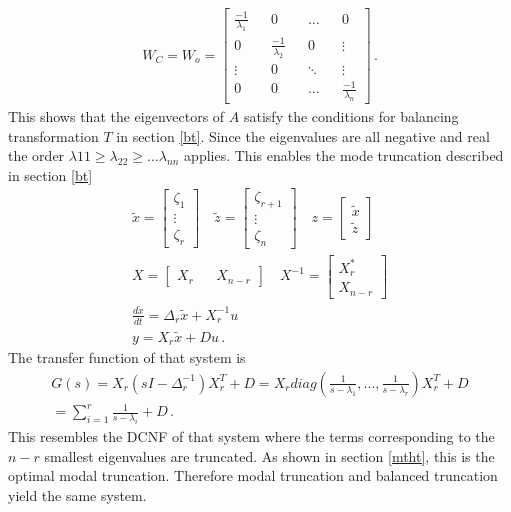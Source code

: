 \begin{gather}
W_C = W_o = \begin{bmatrix}
\frac{-1}{\lambda_1} && 0 && \hdots && 0 \\
0 && \frac{-1}{\lambda_2}&& 0 && \vdots \\
\vdots && 0 && \ddots && \vdots \\
0 && 0 && \hdots && \frac{-1}{\lambda_n}
\end{bmatrix} \,.
\end{gather}
This shows that the eigenvectors of \(A\) satisfy the conditions for balancing transformation \(T\) in section \ref{bt}.
Since the eigenvalues are all negative and real the order \(\lambda{11} \geq \lambda_{22} \geq ...  \lambda_{nn}\) applies.
This enables the mode truncation described in section \ref{bt}
\begin{gather}
\tilde{x} = \begin{bmatrix}
\zeta_1 \\
\vdots \\
\zeta_r
\end{bmatrix} \quad 
\tilde{z} = \begin{bmatrix}
\zeta_{r+1} \\
\vdots \\
\zeta_n
\end{bmatrix} \quad
z = \begin{bmatrix}
\tilde{x} \\
\tilde{z}
\end{bmatrix}\\
X= \begin{bmatrix}
X_r && X_{n-r}
\end{bmatrix} \quad
X^{-1} = \begin{bmatrix}
X_r^{*} \\
X_{n-r}
\end{bmatrix} \\
\frac{d\tilde{x}}{dt} = \Delta_r \tilde{x} + X^{-1}_ru \\
y = X_r\tilde{x} + Du \,.
\end{gather}
The transfer function of that system is
\begin{gather}
G(s) = X_r(sI - \Delta_r^{-1})X_r^{T}+D = X_r diag(\frac{1}{s-\lambda_1}, ..., \frac{1}{s-\lambda_r})X_r^{T}+D \\
= \sum_{i=1}^{r} \frac{1}{s-\lambda_i} + D \,.
\end{gather}
This resembles the DCNF of that system where the terms corresponding to the \(n-r\) smallest eigenvalues are truncated.
As shown in section \ref{mtht}, this is the optimal modal truncation.
Therefore modal truncation and balanced truncation yield the same system.




